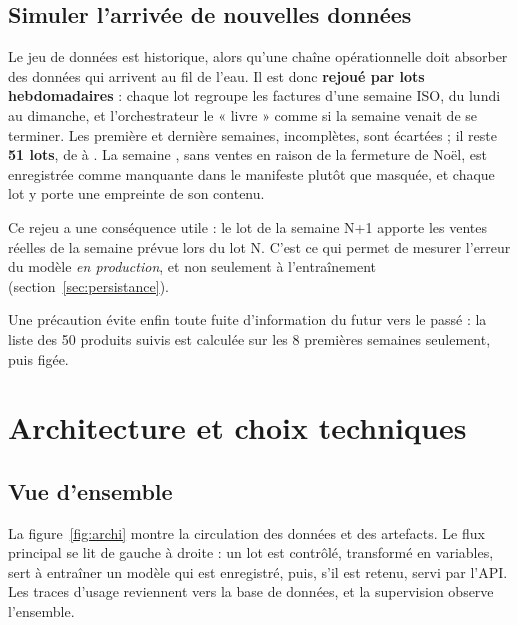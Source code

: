 \documentclass[11pt,a4paper]{article}
\newcommand{\code}[1]{\texttt{\detokenize{#1}}}
\begin{document}
\subsection{Simuler l'arrivée de nouvelles données}

Le jeu de données est historique, alors qu'une chaîne opérationnelle doit absorber des
données qui arrivent au fil de l'eau. Il est donc \textbf{rejoué par lots hebdomadaires} :
chaque lot regroupe les factures d'une semaine ISO, du lundi au dimanche, et l'orchestrateur
le « livre » comme si la semaine venait de se terminer. Les première et dernière semaines,
incomplètes, sont écartées ; il reste \textbf{51 lots}, de \code{2010-W49} à
\code{2011-W48}. La semaine \code{2010-W52}, sans ventes en raison de la fermeture de Noël,
est enregistrée comme manquante dans le manifeste plutôt que masquée, et chaque lot y porte
une empreinte de son contenu.

Ce rejeu a une conséquence utile : le lot de la semaine N+1 apporte les ventes réelles de la
semaine prévue lors du lot N. C'est ce qui permet de mesurer l'erreur du modèle \emph{en
production}, et non seulement à l'entraînement (section~\ref{sec:persistance}).

Une précaution évite enfin toute fuite d'information du futur vers le passé : la liste des
50 produits suivis est calculée sur les 8 premières semaines seulement, puis figée.

\section{Architecture et choix techniques}\label{sec:archi}

\subsection{Vue d'ensemble}

La figure~\ref{fig:archi} montre la circulation des données et des artefacts. Le flux
principal se lit de gauche à droite : un lot est contrôlé, transformé en variables, sert à
entraîner un modèle qui est enregistré, puis, s'il est retenu, servi par l'API. Les traces
d'usage reviennent vers la base de données, et la supervision observe l'ensemble.
\end{document}
